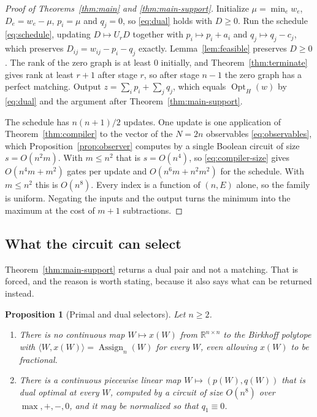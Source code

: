 \documentclass[11pt]{article}
\newtheorem{proposition}[theorem]{Proposition}
\newcommand{\Assign}{\operatorname{Assign}}
\newcommand{\Opt}{\operatorname{Opt}}
\begin{document}
\begin{proof}[Proof of Theorems~\ref{thm:main} and \ref{thm:main-support}]
Initialize $\mu=\min_{e}w_e$, $D_e=w_e-\mu$, $p_i=\mu$ and $q_j=0$, so
\eqref{eq:dual} holds with $D\ge0$.  Run the schedule \eqref{eq:schedule},
updating $D\mapsto U_rD$ together with $p_i\mapsto p_i+a_i$ and
$q_j\mapsto q_j-c_j$, which preserves $D_{ij}=w_{ij}-p_i-q_j$ exactly.
Lemma~\ref{lem:feasible} preserves $D\ge0$.  The rank of the zero graph is at
least $0$ initially, and Theorem~\ref{thm:terminate} gives rank at least $r+1$
after stage $r$, so after stage $n-1$ the zero graph has a perfect matching.
Output $z=\sum_ip_i+\sum_jq_j$, which equals $\Opt_H(w)$ by \eqref{eq:dual} and
the argument after Theorem~\ref{thm:main-support}.

The schedule has $n(n+1)/2$ updates.  One update is one application of
Theorem~\ref{thm:compiler} to the vector of the $N=2n$ observables
\eqref{eq:observables}, which Proposition~\ref{prop:observer} computes by a
single Boolean circuit of size $s=O(n^{2}m)$.  With $m\le n^{2}$ that is
$s=O(n^{4})$, so \eqref{eq:compiler-size} gives $O(n^{4}m+m^{2})$ gates per
update and $O(n^{6}m+n^{2}m^{2})$ for the schedule.  With $m\le n^{2}$ this is
$O(n^{8})$.  Every index is a function of $(n,E)$ alone, so
the family is uniform.  Negating the inputs and the output turns the minimum
into the maximum at the cost of $m+1$ subtractions.
\end{proof}

\subsection{What the circuit can select}
\label{sec:selectors}

Theorem~\ref{thm:main-support} returns a dual pair and not a matching.  That is
forced, and the reason is worth stating, because it also says what can be
returned instead.

\begin{proposition}[Primal and dual selectors]
\label{prop:selectors}
Let $n\ge2$.
\begin{enumerate}
  \item There is no continuous map $W\mapsto x(W)$ from $\mathbb R^{n\times n}$
        to the Birkhoff polytope with $\langle W,x(W)\rangle=\Assign_n(W)$ for
        every $W$, even allowing $x(W)$ to be fractional.
  \item There is a continuous piecewise linear map $W\mapsto(p(W),q(W))$ that is
        dual optimal at every $W$, computed by a circuit of size $O(n^{8})$ over
        $\max,+,-,0$, and it may be normalized so that $q_1\equiv0$.
\end{enumerate}
\end{proposition}
\end{document}
